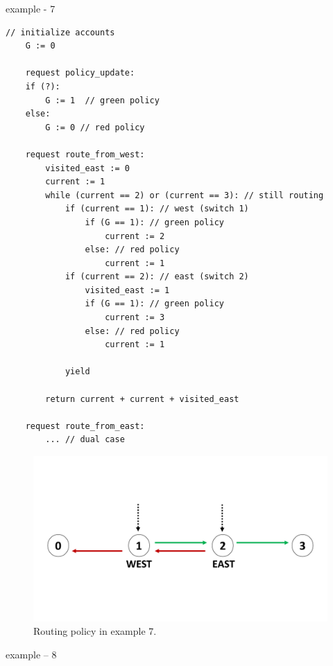 \newpage

example - 7

\begin{minipage}[t]{1.0\textwidth}
	\begin{lstlisting}[caption={BGP (non serializable --- cycles can appear)}]
    // initialize accounts
    G := 0
    
    request policy_update:
    if (?):
        G := 1  // green policy 
    else:
        G := 0 // red policy
		
    request route_from_west:
        visited_east := 0
        current := 1
        while (current == 2) or (current == 3): // still routing        
            if (current == 1): // west (switch 1)
                if (G == 1): // green policy
                    current := 2
                else: // red policy
                    current := 1
            if (current == 2): // east (switch 2)
                visited_east := 1
                if (G == 1): // green policy
                    current := 3
                else: // red policy
                    current := 1
 
            yield
		
        return current + current + visited_east
        
    request route_from_east:
        ... // dual case     		        
	\end{lstlisting}
\end{minipage}



\begin{figure}[h]
	\centering
	\includegraphics[width=0.65\linewidth]{plots/BgpColoredRouting.pdf}
	\caption{Routing policy in example 7.}
	\label{fig:pdfimage}
\end{figure}

\newpage


example – 8

